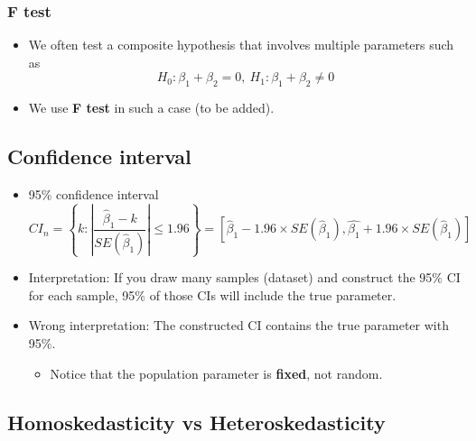 \documentclass[]{book}
\providecommand{\tightlist}{%
  \setlength{\itemsep}{0pt}\setlength{\parskip}{0pt}}
\begin{document}
\hypertarget{f-test}{%
\subsubsection{F test}\label{f-test}}

\begin{itemize}
\tightlist
\item
  We often test a composite hypothesis that involves multiple parameters such as
  \[
   H_{0}:\beta_{1} + \beta_2 = 0,\ H_{1}:\beta_{1} + \beta_2 \neq 0
    \]
\item
  We use \textbf{F test} in such a case (to be added).
\end{itemize}

\hypertarget{confidence-interval}{%
\subsection{Confidence interval}\label{confidence-interval}}

\begin{itemize}
\tightlist
\item
  95\% confidence interval
  \[
    CI_{n}  =\left\{ k:|\frac{\hat{\beta}_{1}-k}{SE(\hat{\beta}_{1})}|\leq1.96\right\} 
    =\left[\hat{\beta}_{1}-1.96\times SE(\hat{\beta}_{1}),\hat{\beta_{1}}+1.96\times SE(\hat{\beta}_{1})\right]
  \]
\item
  Interpretation: If you draw many samples (dataset) and construct the 95\% CI for each sample, 95\% of those CIs will include the true parameter.
\item
  Wrong interpretation: The constructed CI contains the true parameter with 95\%.

  \begin{itemize}
  \tightlist
  \item
    Notice that the population parameter is \textbf{fixed}, not random.
  \end{itemize}
\end{itemize}

\hypertarget{homoskedasticity-vs-heteroskedasticity}{%
\subsection{Homoskedasticity vs Heteroskedasticity}\label{homoskedasticity-vs-heteroskedasticity}}
\end{document}
